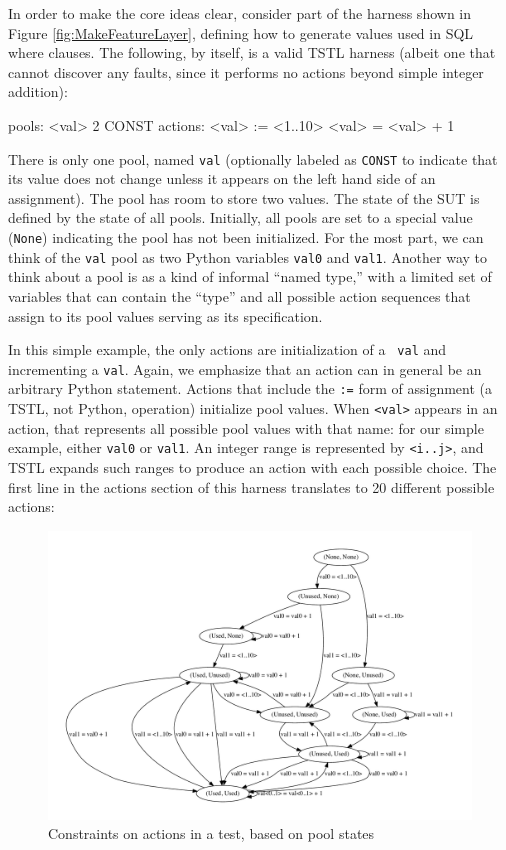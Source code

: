 In order to make the core ideas clear,
consider part of the harness shown in Figure \ref{fig:MakeFeatureLayer}, defining how to
generate values used in SQL where clauses.  The following, by itself,
is a valid TSTL harness (albeit one that cannot discover any
faults, since it performs no actions beyond simple integer addition):

{\scriptsize
\begin{code}
pools:
  <val> 2 CONST
\vspace{0.05in}
actions:
\vspace{0.05in}
<val> := <1..10>
<val> = <val> + 1
\end{code}
}

There is only one pool, named {\tt val} (optionally labeled as {\tt CONST} to
indicate that its value does not change unless it appears on the left
hand side of an assignment).  The pool has room to store
two values.  The state of the SUT is defined by the state of all
pools.  Initially, all pools are set to a special value ({\tt None}) indicating the
pool has not been initialized.  For the most part, we can think of the
{\tt val} pool as two Python variables {\tt val0} and {\tt val1}.  Another
way to think about a pool is as a kind of informal ``named type,''
with a limited set of variables that can contain the ``type'' and all
possible action sequences that assign to its pool values serving as its specification.

In this simple example, the only actions are initialization of a {\tt
  val} and incrementing a {\tt val}.  Again, we emphasize that an
action can in general be an arbitrary Python statement.  Actions that
include the {\tt :=} form of assignment (a TSTL, not Python,
operation) initialize pool values.  When {\tt <val>} appears in an
action, that represents all possible pool values with that name: for
our simple example, either {\tt val0} or {\tt val1}.  An integer range
is represented by {\tt <i..j>}, and TSTL expands such ranges to
produce an action with each possible choice. The first line in the
actions section of this harness translates to 20 different possible
actions:

\begin{figure}
\includegraphics[width=\columnwidth]{states}
\caption{Constraints on actions in a test, based on pool states}
\label{fig:poolacts}
\end{figure}

